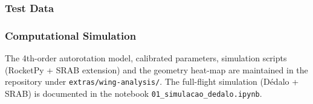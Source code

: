 
\subsubsection{Test Data}


\subsubsection{Computational Simulation}

The 4th-order autorotation model, calibrated parameters, simulation
scripts (RocketPy + SRAB extension) and the geometry heat-map are
maintained in the repository under \texttt{extras/wing-analysis/}.
The full-flight simulation (Dédalo + SRAB) is documented in the
notebook \texttt{01\_simulacao\_dedalo.ipynb}.
